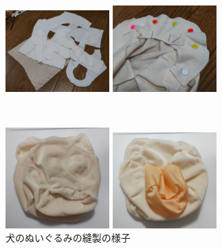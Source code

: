 \documentclass[uplatex,a4paper,12pt]{jsarticle}
\begin{document}
\begin{figure}[htbp]
  \centering
  \begin{minipage}[c]{0.48\linewidth}
    \centering
    \includegraphics[keepaspectratio,width=4cm,clip]{images/mohukawa/saw_01.jpg}
  \end{minipage}
  \begin{minipage}[c]{0.48\linewidth}
    \centering
    \includegraphics[keepaspectratio,width=4cm,clip]{images/mohukawa/saw_02.jpg}
  \end{minipage} \\
  \begin{minipage}[c]{0.48\linewidth}
    \centering
    \includegraphics[keepaspectratio,width=4cm,clip]{images/mohukawa/saw_03.jpg}
  \end{minipage}
  \begin{minipage}[c]{0.48\linewidth}
    \centering
    \includegraphics[keepaspectratio,width=4cm,clip]{images/mohukawa/saw_04.jpg}
  \end{minipage}
  \caption{犬のぬいぐるみの縫製の様子}
  \label{fig:mohukawa:saw}
\end{figure}
\end{document}
